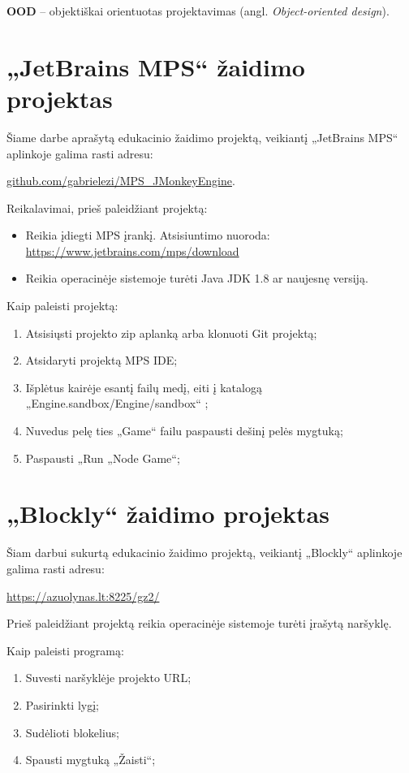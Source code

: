 \documentclass{VUMIFPSkursinis}
\begin{document}
\textbf{OOD} -- objektiškai orientuotas projektavimas (angl. \textit{Object-oriented design}).

\appendix

\section{„JetBrains MPS“ žaidimo projektas}
Šiame darbe aprašytą edukacinio žaidimo projektą, veikiantį „JetBrains MPS“ aplinkoje galima rasti adresu:

\url{github.com/gabrielezi/MPS_JMonkeyEngine}.

Reikalavimai, prieš paleidžiant projektą:
\begin{itemize}
    \item Reikia įdiegti MPS įrankį. Atsisiuntimo nuoroda: \url{https://www.jetbrains.com/mps/download}
    \item Reikia operacinėje sistemoje turėti Java JDK 1.8 ar naujesnę versiją.
\end{itemize}

Kaip paleisti projektą:
\begin{enumerate}
    \item Atsisiųsti projekto zip aplanką arba klonuoti Git projektą;
    \item Atsidaryti projektą MPS IDE;
    \item Išplėtus kairėje esantį failų medį, eiti į katalogą „Engine.sandbox/Engine/sandbox“ ;
    \item Nuvedus pelę ties „Game“ failu paspausti dešinį pelės mygtuką;
    \item Paspausti „Run „Node Game“;
\end{enumerate}

\section{„Blockly“ žaidimo projektas}
Šiam darbui sukurtą edukacinio žaidimo projektą, veikiantį „Blockly“ aplinkoje galima rasti adresu:

\url{https://azuolynas.lt:8225/gz2/}

Prieš paleidžiant projektą reikia operacinėje sistemoje turėti įrašytą naršyklę.

Kaip paleisti programą:
\begin{enumerate}
    \item Suvesti naršyklėje projekto URL;
    \item Pasirinkti lygį;
    \item Sudėlioti blokelius;
    \item Spausti mygtuką „Žaisti“;
\end{enumerate}
\end{document}
